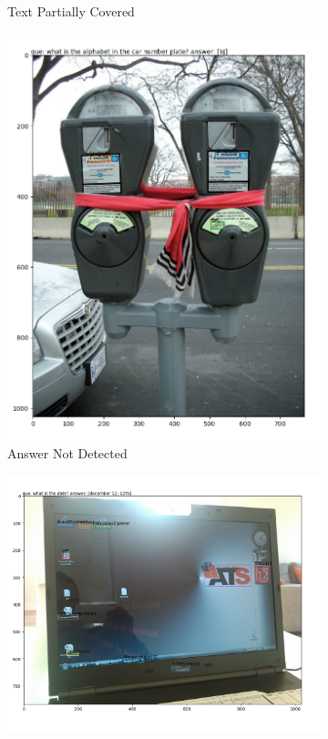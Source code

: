 \begin{figure}
\begin{subfigure}[b]{.4\textwidth}
\caption{Text Partially Covered}\label{fig:partially_covered}
\end{subfigure}
\begin{subfigure}[b]{.33\textwidth}
\includegraphics[width=\textwidth]{figures/not_detected.png}
\caption{Answer Not Detected}\label{fig:not_detected}
\end{subfigure}
\begin{subfigure}[b]{.5\textwidth}
\includegraphics[width=\textwidth]{figures/ocr_not_helpful.png}

\end{subfigure}
\end{figure}
